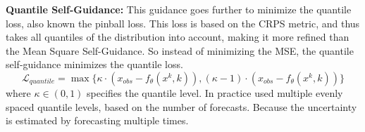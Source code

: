 \textbf{Quantile Self-Guidance:}
This guidance goes further to minimize the quantile loss, also known the pinball loss. This loss is based on the CRPS metric, and thus takes all quantiles of the distribution into account, making it more refined than the Mean Square Self-Guidance.
So instead of minimizing the MSE, the quantile self-guidance minimizes the quantile loss. 
\begin{equation}
    \mathcal{L}_{quantile} = \max \{\kappa \cdot (x_{obs} - f_\theta(x^k, k)), (\kappa - 1) \cdot (x_{obs} - f_\theta(x^k, k))\}    
\end{equation}
where $\kappa \in (0,1)$ specifies the quantile level. In practice \textcite{kollovieh_predict_2023} used multiple evenly spaced quantile levels, based on the number of forecasts. Because the uncertainty is estimated by forecasting multiple times.

